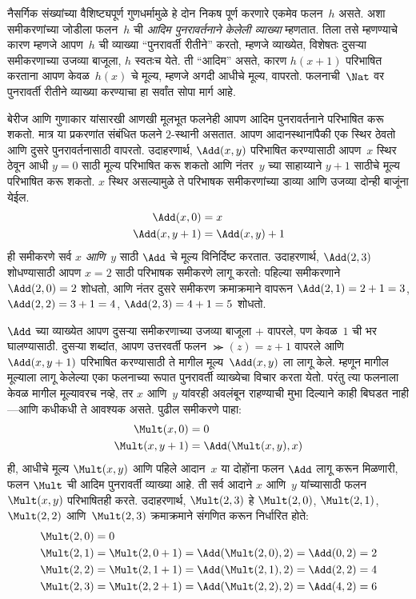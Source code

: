 नैसर्गिक संख्यांच्या वैशिष्ट्यपूर्ण गुणधर्मामुळे हे दोन निकष पूर्ण करणारे
एकमेव फलन~$h$ असते. अशा समीकरणांच्या जोडीला फलन~$h$ ची
\emph{आदिम पुनरावर्तनाने केलेली व्याख्या} म्हणतात. तिला तसे म्हणण्याचे
कारण म्हणजे आपण~$h$ ची व्याख्या ``पुनरावर्ती रीतीने'' करतो, म्हणजे
व्याख्येत, विशेषतः दुसऱ्या समीकरणाच्या उजव्या बाजूला, $h$ स्वतःच येते.
ती ``आदिम'' असते, कारण $h(x+1)$ परिभाषित करताना आपण केवळ~$h(x)$ चे
मूल्य, म्हणजे अगदी आधीचे मूल्य, वापरतो. फलनाची~$\Nat$ वर पुनरावर्ती
रीतीने व्याख्या करण्याचा हा सर्वांत सोपा मार्ग आहे.

बेरीज आणि गुणाकार यांसारखी आणखी मूलभूत फलनेही आपण आदिम पुनरावर्तनाने
परिभाषित करू शकतो. मात्र या प्रकरणांत संबंधित फलने $2$-स्थानी असतात.
आपण आदानस्थानांपैकी एक स्थिर ठेवतो आणि दुसरे पुनरावर्तनासाठी वापरतो.
उदाहरणार्थ, $\Add(x, y)$ परिभाषित करण्यासाठी आपण~$x$ स्थिर ठेवून आधी
$y=0$ साठी मूल्य परिभाषित करू शकतो आणि नंतर~$y$ च्या साहाय्याने $y+1$
साठीचे मूल्य परिभाषित करू शकतो. $x$ स्थिर असल्यामुळे ते परिभाषक
समीकरणांच्या डाव्या आणि उजव्या दोन्ही बाजूंना येईल.
\begin{align*}
\Add(x,0) & =  x\\
\Add(x,y+1) & =  \Add(x,y)+1
\end{align*}
ही समीकरणे सर्व $x$ \emph{आणि}~$y$ साठी $\Add$ चे मूल्य विनिर्दिष्ट
करतात. उदाहरणार्थ, $\Add(2,3)$ शोधण्यासाठी आपण $x = 2$ साठी परिभाषक
समीकरणे लागू करतो: पहिल्या समीकरणाने $\Add(2,0) = 2$ शोधतो, आणि नंतर
दुसरे समीकरण क्रमाक्रमाने वापरून $\Add(2,1) = 2 + 1 = 3$,
$\Add(2, 2) = 3 + 1 = 4$, $\Add(2, 3) = 4 + 1 = 5$ शोधतो.

$\Add$ च्या व्याख्येत आपण दुसऱ्या समीकरणाच्या उजव्या बाजूला $+$ वापरले,
पण केवळ~$1$ ची भर घालण्यासाठी. दुसऱ्या शब्दांत, आपण उत्तरवर्ती फलन
$\Succ(z) = z+1$ वापरले आणि $\Add(x,y+1)$ परिभाषित करण्यासाठी ते मागील
मूल्य~$\Add(x,y)$ ला लागू केले. म्हणून मागील मूल्याला लागू केलेल्या एका
फलनाच्या रूपात पुनरावर्ती व्याख्येचा विचार करता येतो. परंतु त्या फलनाला
केवळ मागील मूल्यावरच नव्हे, तर $x$ आणि~$y$ यांवरही अवलंबून राहण्याची
मुभा दिल्याने काही बिघडत नाही---आणि कधीकधी ते आवश्यक असते. पुढील
समीकरणे पाहा:
\begin{align*}
  \Mult(x,0) & =  0 \\
  \Mult(x,y+1) & =  \Add(\Mult(x,y),x)
\end{align*}
ही, आधीचे मूल्य $\Mult(x,y)$ आणि पहिले आदान~$x$ या दोहोंना फलन
$\Add$ लागू करून मिळणारी, फलन $\Mult$ ची आदिम पुनरावर्ती व्याख्या आहे.
ती सर्व आदाने $x$ आणि~$y$ यांच्यासाठी फलन~$\Mult(x,y)$ परिभाषितही करते.
उदाहरणार्थ, $\Mult(2,3)$ हे $\Mult(2,0)$, $\Mult(2,1)$,
$\Mult(2,2)$ आणि~$\Mult(2,3)$ क्रमाक्रमाने संगणित करून निर्धारित होते:
\begin{align*}
  \Mult(2,0) & = 0\\
  \Mult(2,1) & = \Mult(2,0+1) =
  \Add(\Mult(2,0), 2) = \Add(0, 2) = 2\\
  \Mult(2,2) & = \Mult(2,1+1) =
  \Add(\Mult(2,1), 2) = \Add(2, 2) = 4\\
  \Mult(2,3) & = \Mult(2,2+1) =
  \Add(\Mult(2,2), 2) = \Add(4, 2) = 6
\end{align*}

